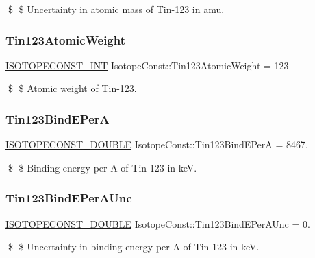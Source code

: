 \$ \$ Uncertainty in atomic mass of Tin-\/123 in amu. \mbox{\label{group___isotope_const-_tin-_sn123_ga694bf55061d4bac63d7504cd21e1f35e}} 
\subsubsection{\texorpdfstring{Tin123\+Atomic\+Weight}{Tin123AtomicWeight}}
{\footnotesize\ttfamily \mbox{\hyperlink{group___isotope_const-_macros_ga5f18360b3e99483a35c32d789e62621c}{I\+S\+O\+T\+O\+P\+E\+C\+O\+N\+S\+T\+\_\+\+I\+NT}} Isotope\+Const\+::\+Tin123\+Atomic\+Weight = 123}

\$ \$ Atomic weight of Tin-\/123. \mbox{\label{group___isotope_const-_tin-_sn123_gae0124a95712748a396dc9162b068125b}} 
\subsubsection{\texorpdfstring{Tin123\+Bind\+E\+PerA}{Tin123BindEPerA}}
{\footnotesize\ttfamily \mbox{\hyperlink{group___isotope_const-_macros_ga8f45a7272ce02c0b4c65c44636ed719a}{I\+S\+O\+T\+O\+P\+E\+C\+O\+N\+S\+T\+\_\+\+D\+O\+U\+B\+LE}} Isotope\+Const\+::\+Tin123\+Bind\+E\+PerA = 8467.}

\$ \$ Binding energy per A of Tin-\/123 in keV. \mbox{\label{group___isotope_const-_tin-_sn123_ga52cc7d728de4b119755d97af4038578e}} 
\subsubsection{\texorpdfstring{Tin123\+Bind\+E\+Per\+A\+Unc}{Tin123BindEPerAUnc}}
{\footnotesize\ttfamily \mbox{\hyperlink{group___isotope_const-_macros_ga8f45a7272ce02c0b4c65c44636ed719a}{I\+S\+O\+T\+O\+P\+E\+C\+O\+N\+S\+T\+\_\+\+D\+O\+U\+B\+LE}} Isotope\+Const\+::\+Tin123\+Bind\+E\+Per\+A\+Unc = 0.}

\$ \$ Uncertainty in binding energy per A of Tin-\/123 in keV. \mbox{\label{group___isotope_const-_tin-_sn123_ga1c08706ea8c41f410ebd48ba918fb1d0}} 

